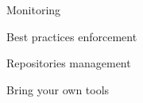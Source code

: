 \begin{iframe}
\item Monitoring
\item Best practices enforcement
\item Repositories management
\item Bring your own tools
\end{iframe}

\thankyouSlide
\renewcommand{\insertLogo}{}
\contactSlide
